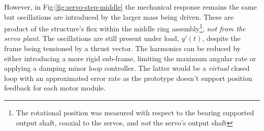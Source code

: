 \par
However, in Fig:\ref{fig:servo-step-middle} the mechanical response remains the same but oscillations are introduced by the larger mass being driven. These are product of the structure's flex within the middle ring assembly\footnote{The rotational position was measured with respect to the bearing supported output shaft, coaxial to the servos, and \emph{not} the servo's output shaft}, \emph{not from the servo plant}. The oscillations are still present under load, $y'(t)$, despite the frame being tensioned by a thrust vector. The harmonics can be reduced by either introducing a more rigid sub-frame, limiting the maximum angular rate or applying a damping minor loop controller. The latter would be a \emph{virtual} closed loop with an approximated error rate as the prototype doesn't support position feedback for each motor module.

